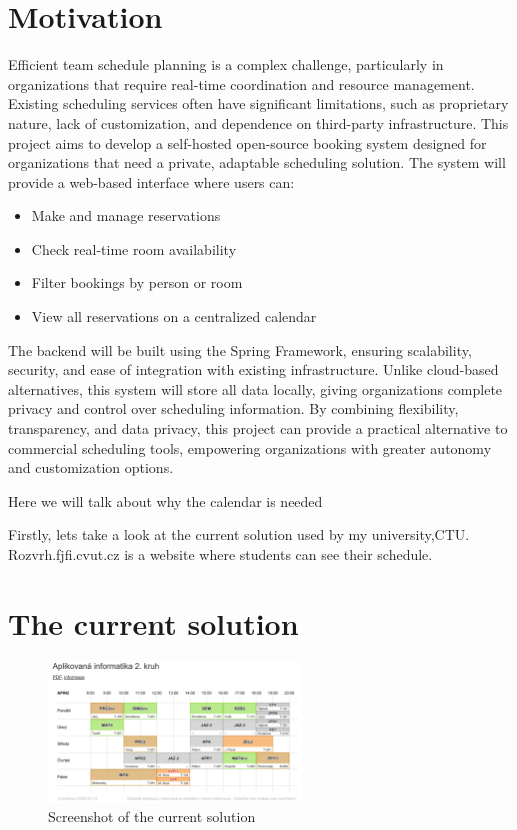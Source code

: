 \section*{Motivation}
Efficient team schedule planning is a complex challenge, particularly in organizations that require real-time coordination and resource management.
Existing scheduling services often have significant limitations, such as proprietary nature, lack of customization, and dependence on third-party infrastructure.
This project aims to develop a self-hosted open-source booking system designed for organizations that need a private, adaptable scheduling solution.
The system will provide a web-based interface where users can:
\begin{itemize}
    \item Make and manage reservations
    \item Check real-time room availability
    \item  Filter bookings by person or room
    \item View all reservations on a centralized calendar
\end{itemize}

The backend will be built using the Spring Framework, ensuring scalability, security, and ease of integration with existing infrastructure.
Unlike cloud-based alternatives, this system will store all data locally, giving organizations complete privacy and control over scheduling information.
By combining flexibility, transparency, and data privacy, this project can provide a practical alternative to commercial scheduling tools, empowering organizations with greater autonomy and customization options.


\pagestyle{headings}
Here we will talk about why the calendar is needed

Firstly, lets take a look at the current solution used by my university,CTU. Rozvrh.fjfi.cvut.cz is a website where students can see their schedule.
\section{The current solution}\label{sec:the-current-solution}
\begin{figure}[h]
  \centering
  \includegraphics[width=0.6\textwidth]{img}
  \caption{Screenshot of the current solution}
  \label{fig:rozvrh}
\end{figure}

